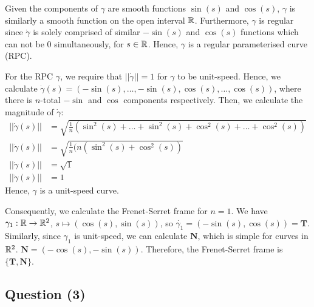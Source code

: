 \documentclass{article}
\begin{document}
    \begin{flushleft}
        Given the components of $\gamma$ are smooth functions $\sin(s)$ and $\cos(s)$, $\gamma$ is similarly a smooth function on the open interval $\mathbb{R}$. Furthermore, $\gamma$ is regular since $\dot{\gamma}$ is solely comprised of similar $-\sin(s)$ and $\cos(s)$ functions which can not be $0$ simultaneously, for $s \in \mathbb{R}$. Hence, $\gamma$ is a regular parameterised curve (RPC). \newline

        For the RPC $\gamma$, we require that $||\dot{\gamma}|| = 1$ for $\gamma$ to be unit-speed. Hence, we calculate $\dot{\gamma}(s) = (-\sin(s), \dots, -\sin(s), \cos(s), \dots, \cos(s))$, where there is $n$-total $-\sin$ and $\cos$ components respectively. Then, we calculate the magnitude of $\dot{\gamma}$:
        \begin{align*}
            ||\dot{\gamma}(s)|| &= \sqrt{\frac{1}{n}(\sin^2(s) + \dots + \sin^2(s) + \cos^2(s) + \dots + \cos^2(s))} \\
            ||\dot{\gamma}(s)|| &= \sqrt{\frac{1}{n}(n(\sin^2(s) + \cos^2(s))} \\ 
            ||\dot{\gamma}(s)|| &= \sqrt{1} \\ 
            ||\dot{\gamma}(s)|| &= 1
        \end{align*}
        Hence, $\gamma$ is a unit-speed curve. \newline 

        Consequently, we calculate the Frenet-Serret frame for $n=1$. We have $\gamma_1 : \mathbb{R} \rightarrow \mathbb{R}^2$, $s \mapsto (\cos(s), \sin(s))$, so $\dot{\gamma_1} = (-\sin(s), \cos(s)) = \mathbf{T}$. Similarly, since $\gamma_1$ is unit-speed, we can calculate $\mathbf{N}$, which is simple for curves in $\mathbb{R}^2$. $\mathbf{N} = (-\cos(s), -\sin(s))$. Therefore, the Frenet-Serret frame is $\{\mathbf{T}, \mathbf{N}\}$.
    \end{flushleft}
\begin{center}
    \section*{Question (3)}
\end{center}
\end{document}
